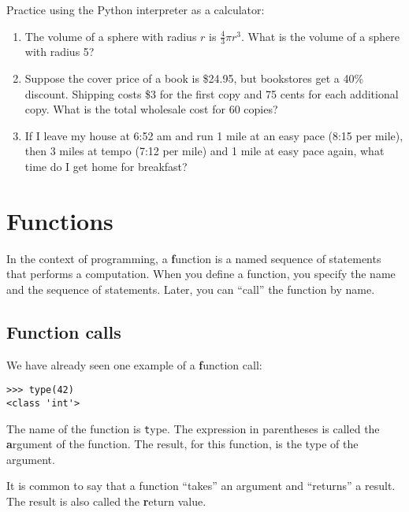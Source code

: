 \documentclass[
DIV=11,
fontsize=12,
twoside,
headinclude=false,
titlepage=firstiscover,
abstract=true,
headsepline=true,
footsepline=true,
chapterprefix=true, %
headings=big,
bibliography=totoc,%
captions=tableheading
]{scrbook}
\theoremstyle{definition}
\begin{document}
\begin{exercise}
\normalfont

Practice using the Python interpreter as a calculator: 

\begin{enumerate}

\item The volume of a sphere with radius $r$ is $\frac{4}{3} \pi r^3$.
  What is the volume of a sphere with radius 5?

\item Suppose the cover price of a book is \$24.95, but bookstores get a
  40\% discount.  Shipping costs \$3 for the first copy and 75 cents
  for each additional copy.  What is the total wholesale cost for
  60 copies?

\item If I leave my house at 6:52 am and run 1 mile at an easy pace
  (8:15 per mile), then 3 miles at tempo (7:12 per mile) and 1 mile at
  easy pace again, what time do I get home for breakfast?

\end{enumerate}
\end{exercise}


\chapter{Functions}
\label{funcchap}

In the context of programming, a {\textbf function} is a named sequence of
statements that performs a computation.  When you define a function,
you specify the name and the sequence of statements.  Later, you can
``call'' the function by name.  

\section{Function calls}
\label{functionchap}

We have already seen one example of a {\textbf function call}:

\begin{lstlisting}
>>> type(42)
<class 'int'>
\end{lstlisting}
%
The name of the function is {\texttt type}.  The expression in parentheses
is called the {\textbf argument} of the function.  The result, for this
function, is the type of the argument.

It is common to say that a function ``takes'' an argument and ``returns''
a result.  The result is also called the {\textbf return value}.
\end{document}
